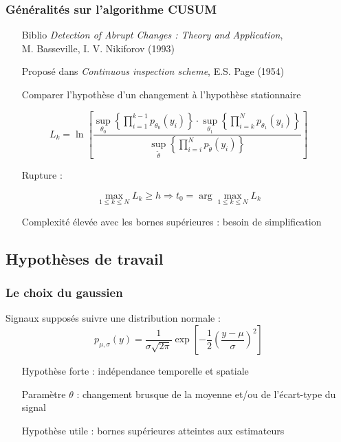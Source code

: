 \documentclass{beamer}
\begin{document}
\begin{frame}
	\frametitle{Généralités sur l'algorithme CUSUM}
	\begin{itemize}
		\item[Biblio] \emph{Detection of Abrupt Changes : Theory and Application},\\
		M. Basseville, I. V. Nikiforov (1993)
		\item[Proposé] dans \emph{Continuous inspection scheme}, E.S. Page (1954)
		\item[Comparer] l'hypothèse d'un changement à l'hypothèse stationnaire
	\end{itemize}
	\begin{equation}
		L _k =\ln \left[ \frac{\sup_{\theta_0}\left\{ \prod_{i=1}^{k-1} p_{\theta_0}(y_i) \right\} \cdot \sup_{\theta_1} \left\{ \prod_{i = k}^{N}p_{\theta_1}(y_i) \right\}}{\sup_{\tilde\theta}\left\{\prod_{i=i}^{N}p_{\tilde{\theta}}(y_i)\right\}} \right]
	\end{equation}
	\begin{itemize}
		\item[Rupture]:
	\end{itemize}
	\begin{equation}
		\max_{1 \leq k \leq N} L_k \geq h \Rightarrow t_0 = \arg \max_{1 \leq k \leq N} L_k
	\end{equation}
	\begin{itemize}
		\item[Complexité] élevée avec les bornes supérieures : besoin de simplification
	\end{itemize}
\end{frame}

\subsection{Hypothèses de travail}

\begin{frame}
	\frametitle{Le choix du gaussien}
	Signaux supposés suivre une distribution normale :
	\begin{equation}
		p_{\mu, \sigma}(y) = \frac1{\sigma\sqrt{2 \pi}} \exp \left[ -\frac12 \left( \frac{y - \mu}{\sigma} \right)^2 \right]
	\end{equation}
	\begin{itemize}
		\item[Hypothèse] forte : indépendance temporelle et spatiale
		\item[Paramètre] $\theta$ : changement brusque de la moyenne et/ou de l'écart-type du signal
		\item[Hypothèse] utile : bornes supérieures atteintes aux estimateurs
	\end{itemize}
\end{frame}
\end{document}
